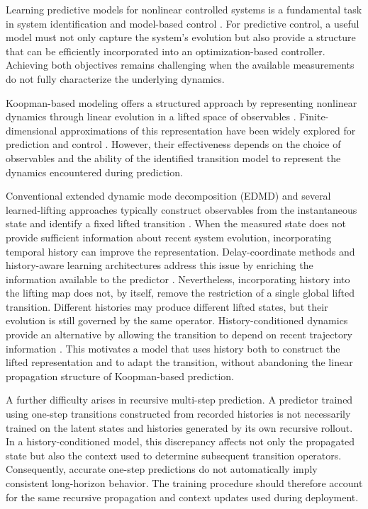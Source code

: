\documentclass[journal]{IEEEtran}
\begin{document}
Learning predictive models for nonlinear controlled systems is a fundamental task in system identification and model-based control \cite{ljung1999system, vanoverschee1994n4sid, nelles2020nonlinear}. For predictive control, a useful model must not only capture the system's evolution but also provide a structure that can be efficiently incorporated into an optimization-based controller. Achieving both objectives remains challenging when the available measurements do not fully characterize the underlying dynamics.

Koopman-based modeling offers a structured approach by representing nonlinear dynamics through linear evolution in a lifted space of observables \cite{koopman1931hamiltonian, brunton2022modern}. Finite-dimensional approximations of this representation have been widely explored for prediction and control \cite{otto2021koopman, korda2018linear}. However, their effectiveness depends on the choice of observables and the ability of the identified transition model to represent the dynamics encountered during prediction.

Conventional extended dynamic mode decomposition (EDMD) and several learned-lifting approaches typically construct observables from the instantaneous state and identify a fixed lifted transition \cite{williams2015data, lusch2018deep, takeishi2017koopman}. When the measured state does not provide sufficient information about recent system evolution, incorporating temporal history can improve the representation. Delay-coordinate methods and history-aware learning architectures address this issue by enriching the information available to the predictor \cite{kamb2020timedelay, brunton2017chaos}. Nevertheless, incorporating history into the lifting map does not, by itself, remove the restriction of a single global lifted transition. Different histories may produce different lifted states, but their evolution is still governed by the same operator. History-conditioned dynamics provide an alternative by allowing the transition to depend on recent trajectory information \cite{liu2023koopa, li2025mamko}. This motivates a model that uses history both to construct the lifted representation and to adapt the transition, without abandoning the linear propagation structure of Koopman-based prediction.

A further difficulty arises in recursive multi-step prediction. A predictor trained using one-step transitions constructed from recorded histories is not necessarily trained on the latent states and histories generated by its own recursive rollout. In a history-conditioned model, this discrepancy affects not only the propagated state but also the context used to determine subsequent transition operators. Consequently, accurate one-step predictions do not automatically imply consistent long-horizon behavior. The training procedure should therefore account for the same recursive propagation and context updates used during deployment.
\end{document}
